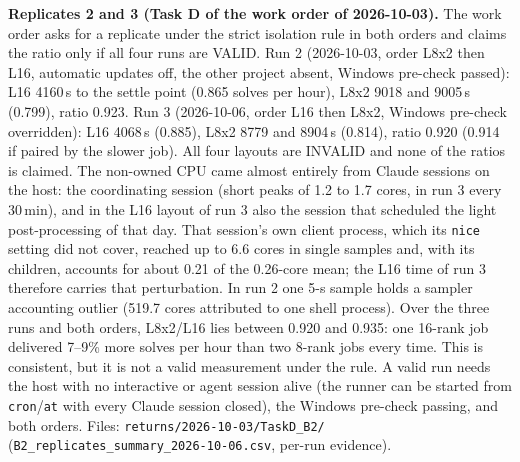 \documentclass[11pt]{article}
\begin{document}
\textbf{Replicates 2 and 3 (Task D of the work order of 2026-10-03).} The work order asks for a replicate under the strict isolation rule in both orders and claims the ratio only if all four runs are VALID. Run 2 (2026-10-03, order L8x2 then L16, automatic updates off, the other project absent, Windows pre-check passed): L16 4160\,s to the settle point (0.865 solves per hour), L8x2 9018 and 9005\,s (0.799), ratio 0.923. Run 3 (2026-10-06, order L16 then L8x2, Windows pre-check overridden): L16 4068\,s (0.885), L8x2 8779 and 8904\,s (0.814), ratio 0.920 (0.914 if paired by the slower job). All four layouts are INVALID and none of the ratios is claimed. The non-owned CPU came almost entirely from Claude sessions on the host: the coordinating session (short peaks of 1.2 to 1.7 cores, in run 3 every 30\,min), and in the L16 layout of run 3 also the session that scheduled the light post-processing of that day. That session's own client process, which its \texttt{nice} setting did not cover, reached up to 6.6 cores in single samples and, with its children, accounts for about 0.21 of the 0.26-core mean; the L16 time of run 3 therefore carries that perturbation. In run 2 one 5-s sample holds a sampler accounting outlier (519.7 cores attributed to one shell process). Over the three runs and both orders, L8x2/L16 lies between 0.920 and 0.935: one 16-rank job delivered 7--9\% more solves per hour than two 8-rank jobs every time. This is consistent, but it is not a valid measurement under the rule. A valid run needs the host with no interactive or agent session alive (the runner can be started from \texttt{cron}/\texttt{at} with every Claude session closed), the Windows pre-check passing, and both orders. Files: \texttt{returns/2026-10-03/TaskD\_B2/} (\texttt{B2\_replicates\_summary\_2026-10-06.csv}, per-run evidence).
\end{document}
